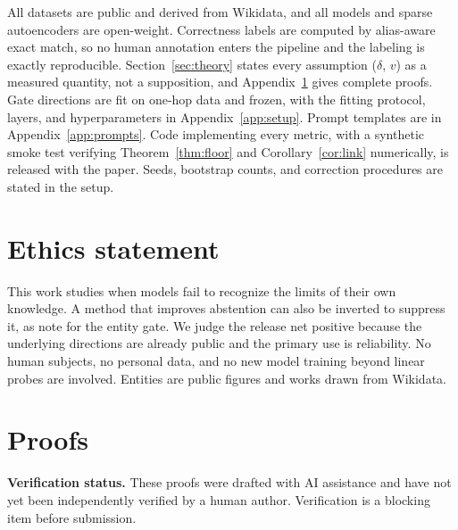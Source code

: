 \documentclass{article}
\begin{document}
All datasets are public and derived from Wikidata, and all models and sparse autoencoders are
open-weight. Correctness labels are computed by alias-aware exact match, so no human annotation enters
the pipeline and the labeling is exactly reproducible. Section~\ref{sec:theory} states every
assumption ($\delta$, $v$) as a measured quantity, not a supposition, and Appendix~\ref{app:proofs}
gives complete proofs. Gate directions are fit on one-hop data and frozen, with the fitting protocol,
layers, and hyperparameters in Appendix~\ref{app:setup}. Prompt templates are in
Appendix~\ref{app:prompts}. Code implementing every metric, with a synthetic smoke test verifying
Theorem~\ref{thm:floor} and Corollary~\ref{cor:link} numerically, is released with the paper. Seeds,
bootstrap counts, and correction procedures are stated in the setup.

\section*{Ethics statement}

This work studies when models fail to recognize the limits of their own knowledge. A method that
improves abstention can also be inverted to suppress it, as \citet{ferrando2025entity} note for the
entity gate. We judge the release net positive because the underlying directions are already public
and the primary use is reliability. No human subjects, no personal data, and no new model training
beyond linear probes are involved. Entities are public figures and works drawn from Wikidata.




\newpage
\appendix

\section{Proofs}
\label{app:proofs}

\noindent\textbf{Verification status.} These proofs were drafted with AI assistance and have not yet
been independently verified by a human author. Verification is a blocking item before submission.
\end{document}
